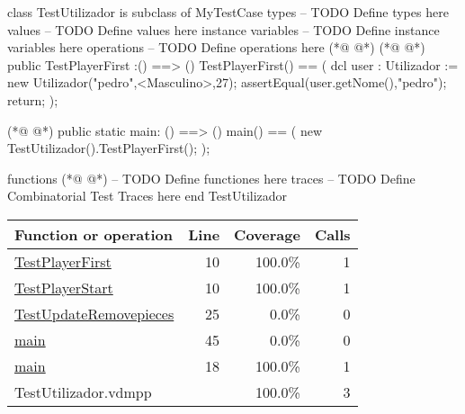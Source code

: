 \begin{vdmpp}[breaklines=true]
class TestUtilizador is subclass of MyTestCase
types
-- TODO Define types here
values
-- TODO Define values here
instance variables
-- TODO Define instance variables here
operations
-- TODO Define operations here
(*@
\label{TestPlayerStart:10}
@*)
(*@
\label{TestPlayerFirst:10}
@*)
public TestPlayerFirst :() ==> ()
TestPlayerFirst() ==
(
 dcl user : Utilizador := new Utilizador("pedro",<Masculino>,27);
 assertEqual(user.getNome(),"pedro");
 return;
);

(*@
\label{main:18}
@*)
public static main: () ==> ()
main() ==
(
   new TestUtilizador().TestPlayerFirst();
);

functions
(*@
\label{TestUpdateRemovepieces:25}
@*)
-- TODO Define functiones here
traces
-- TODO Define Combinatorial Test Traces here
end TestUtilizador
\end{vdmpp}
\bigskip
\begin{longtable}{|l|r|r|r|}
\hline
Function or operation & Line & Coverage & Calls \\
\hline
\hline
\hyperref[TestPlayerFirst:10]{TestPlayerFirst} & 10&100.0\% & 1 \\
\hline
\hyperref[TestPlayerStart:10]{TestPlayerStart} & 10&100.0\% & 1 \\
\hline
\hyperref[TestUpdateRemovepieces:25]{TestUpdateRemovepieces} & 25&0.0\% & 0 \\
\hline
\hyperref[main:45]{main} & 45&0.0\% & 0 \\
\hline
\hyperref[main:18]{main} & 18&100.0\% & 1 \\
\hline
\hline
TestUtilizador.vdmpp & & 100.0\% & 3 \\
\hline
\end{longtable}

